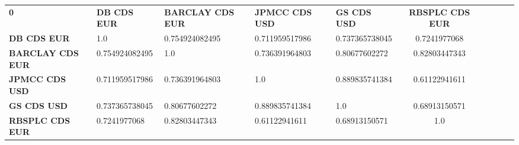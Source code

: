 \begin{tabular}{|l|l|l|l|l|c|c|c|c|c|}
\hline
\textbf{0} & \textbf{DB CDS EUR} & \textbf{BARCLAY CDS EUR} & \textbf{JPMCC CDS USD} & \textbf{GS CDS USD} & \textbf{RBSPLC CDS EUR}\\\hhline{|=|=|=|=|=|=|}
\textbf{DB CDS EUR} & 1.0 & 0.754924082495 & 0.711959517986 & 0.737365738045 & 0.7241977068\\
\textbf{BARCLAY CDS EUR} & 0.754924082495 & 1.0 & 0.736391964803 & 0.80677602272 & 0.82803447343\\
\textbf{JPMCC CDS USD} & 0.711959517986 & 0.736391964803 & 1.0 & 0.889835741384 & 0.61122941611\\
\textbf{GS CDS USD} & 0.737365738045 & 0.80677602272 & 0.889835741384 & 1.0 & 0.68913150571\\
\textbf{RBSPLC CDS EUR} & 0.7241977068 & 0.82803447343 & 0.61122941611 & 0.68913150571 & 1.0\\
\hline
\end{tabular}
